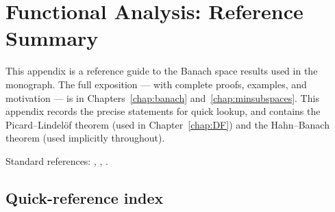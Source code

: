 
\chapter{Functional Analysis: Reference Summary}
\label{app:functional}

This appendix is a reference guide to the Banach space results used
in the monograph. The full exposition --- with complete proofs,
examples, and motivation --- is in Chapters~\ref{chap:banach}
and~\ref{chap:minsubspaces}. This appendix records the precise
statements for quick lookup, and contains the Picard--Lindelöf theorem
(used in Chapter~\ref{chap:DF}) and the Hahn--Banach theorem (used
implicitly throughout).

Standard references: \cite{Hackbusch2019}, \cite{Megginson1998},
\cite{Ryan2002}.

\section{Quick-reference index}
\label{app:functional:index}

